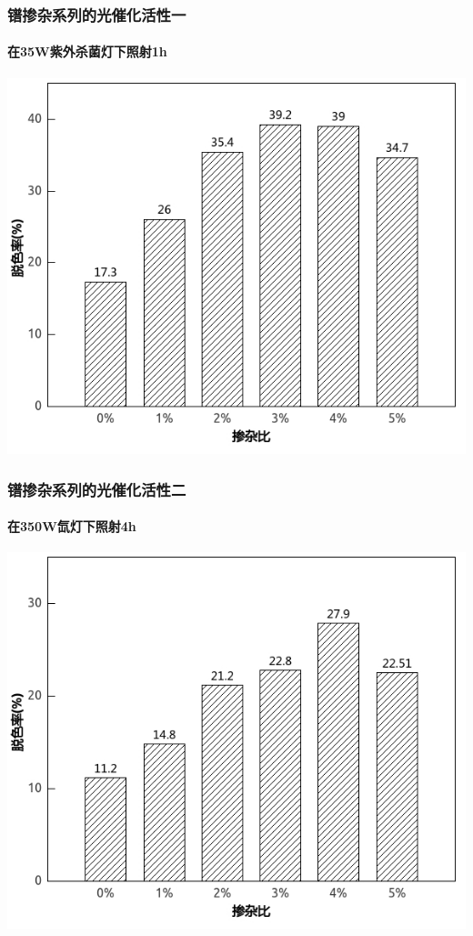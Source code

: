 \documentclass[xetex,compress]{mybeamer}
\begin{document}
\begin{frame}
\frametitle{镨掺杂系列的光催化活性一}
\framesubtitle{在35W紫外杀菌灯下照射1h}
\begin{block}{}
\centering
\includegraphics[scale=6]{figures/镨掺杂活性1.jpg} 
\end{block}
\end{frame}

\begin{frame}
\frametitle{镨掺杂系列的光催化活性二}
\framesubtitle{在350W氙灯下照射4h}
\begin{block}{}
\centering
\includegraphics[scale=6]{figures/镨掺杂活性2.jpg} 
\end{block}
\end{frame}
\end{document}
